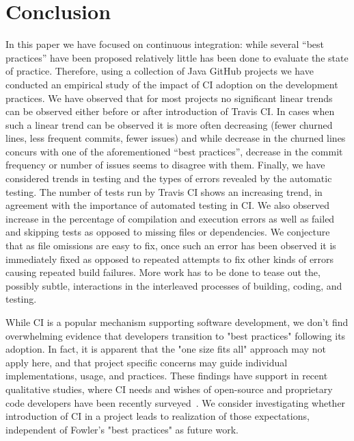 \section{Conclusion}
\label{sec:conc}
In this paper we have focused on continuous integration: while several ``best practices'' have been proposed relatively little has been done to evaluate the state of practice.
Therefore, using a collection of Java GitHub projects we have conducted an empirical study of the impact of CI adoption on the development practices.
We have observed that for most projects no significant linear trends can be observed either before or after introduction of Travis CI.
In cases when such a linear trend can be observed it is more often decreasing (fewer churned lines, less frequent commits, fewer issues) and while
decrease in the churned lines concurs with one of the aforementioned ``best practices'', decrease in the commit frequency or number of issues
seems to disagree with them. 
Finally, we have considered trends in testing and the types of errors revealed by the automatic testing.
The number of tests run by Travis CI shows an increasing trend, 
in agreement with the importance of automated testing in CI.
We also observed increase in the percentage of compilation and execution errors as well as failed and skipping tests as opposed to missing files or dependencies.
We conjecture that as file omissions are easy to fix, once such an error has been observed it is immediately fixed as opposed to repeated attempts to fix other kinds
of errors causing repeated build failures.
More work has to be done to tease out the, possibly subtle, interactions in the interleaved processes of building, coding, and testing.

While CI is a popular mechanism supporting software development, 
we don't find overwhelming evidence that developers transition to "best practices" following its adoption.
In fact, it is apparent that the "one size fits all" approach may not apply here, and that project specific concerns may guide individual implementations, usage, and practices.
These findings have support in recent qualitative studies, where
CI needs and wishes of open-source and proprietary code developers have been recently surveyed~\cite{Hilton2016,hilton2016continuous}.
We consider investigating whether
introduction of CI in a project leads to realization of those expectations, independent of Fowler's "best practices" as future work.
